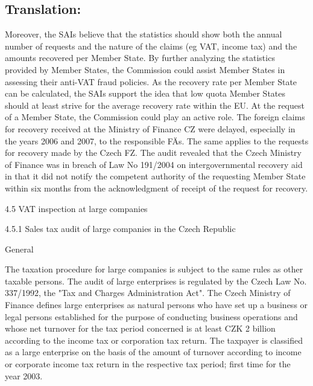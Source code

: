 \documentclass[10pt]{article}
\begin{document}
\pagebreak

\subsection*{Translation:}

Moreover, the SAIs believe that the statistics should show both the annual number of requests and the nature of the claims (eg VAT, income tax) and the amounts recovered per Member State.
By further analyzing the statistics provided by Member States, the Commission could assist Member States in assessing their anti-VAT fraud policies.
As the recovery rate per Member State can be calculated, the SAIs support the idea that low quota Member States should at least strive for the average recovery rate within the EU.
At the request of a Member State, the Commission could play an active role.
The foreign claims for recovery received at the Ministry of Finance CZ were delayed, especially in the years 2006 and 2007, to the responsible FÄs.
The same applies to the requests for recovery made by the Czech FZ.
The audit revealed that the Czech Ministry of Finance was in breach of Law No 191/2004 on intergovernmental recovery aid in that it did not notify the competent authority of the requesting Member State within six months from the acknowledgment of receipt of the request for recovery.


4.5 VAT inspection at large companies



4.5.1 Sales tax audit of large companies in the Czech Republic



General

The taxation procedure for large companies is subject to the same rules as other taxable persons.
The audit of large enterprises is regulated by the Czech Law No. 337/1992, the "Tax and Charges Administration Act".
The Czech Ministry of Finance defines large enterprises as natural persons who have set up a business or legal persons established for the purpose of conducting business operations and whose net turnover for the tax period concerned is at least CZK 2 billion according to the income tax or corporation tax return.
The taxpayer is classified as a large enterprise on the basis of the amount of turnover according to income or corporate income tax return in the respective tax period; first time for the year 2003.
\end{document}
